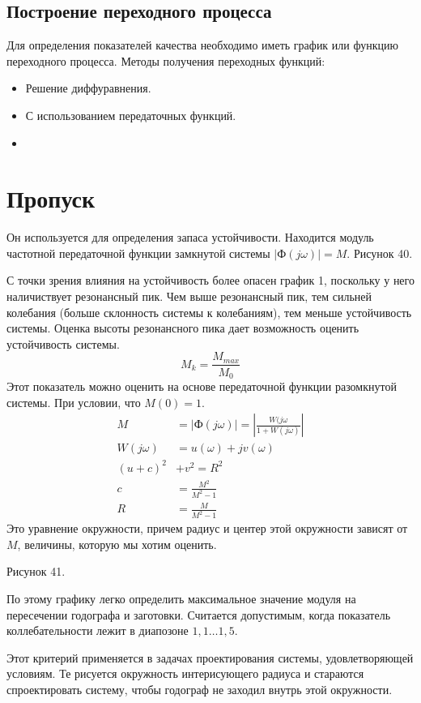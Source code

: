\subsection{Построение переходного процесса}
Для определения показателей качества необходимо иметь график или функцию переходного процесса. Методы получения переходных функций:
\begin{itemize}
	\item Решение диффуравнения.
	\item С использованием передаточных функций.
	\item 
\end{itemize}

\section{Пропуск}

Он используется для определения запаса устойчивости. Находится модуль частотной передаточной функции замкнутой системы $|\text{Ф}(j\omega)|=M$. Рисунок 40.

С точки зрения влияния на устойчивость более опасен график 1, поскольку у него наличиствует резонансный пик. Чем выше резонансный пик, тем сильней колебания (больше склонность системы к колебаниям), тем меньше устойчивость системы. Оценка высоты резонансного пика дает возможность оценить устойчивость системы.
$$
	M_k=\frac{M_{max}}{M_0}
$$
Этот показатель можно оценить на основе передаточной функции разомкнутой системы. При условии, что $M(0)=1$.
\begin{align*}
	M&=|\text{Ф}(j\omega)|=|\frac{W(j\omega}{1+W(j\omega)}| \\
	W(j\omega)&=u(\omega)+jv(\omega) \\
	(u+c)^2&+v^2=R^2\\
	c&=\frac{M^2}{M^2-1}\\
	R&=\frac{M}{M^2-1}
\end{align*}
Это уравнение окружности, причем радиус и центер этой окружности зависят от $M$, величины, которую мы хотим оценить.

Рисунок 41.

По этому графику легко определить максимальное значение модуля на пересечении годографа и заготовки. Считается допустимым, когда показатель коллебательности лежит в диапозоне $1{,}1\ldots1{,}5$.

Этот критерий применяется в задачах проектирования системы, удовлетворяющей условиям. Те рисуется окружность интерисующего радиуса и стараются спроектировать систему, чтобы годограф не заходил внутрь этой окружности.

